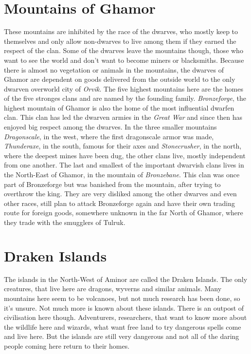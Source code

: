 \documentclass[oneside]{book}
\begin{document}
	\chapter{Mountains of Ghamor}
	These mountains are inhibited by the race of the dwarves, who mostly keep to themselves and only allow non-dwarves to live among them if they earned the respect of the clan. 
	Some of the dwarves leave the mountains though, those who want to see the world and don't want to become miners or blacksmiths.
	Because there is almost no vegetation or animals in the mountains, the dwarves of Ghamor are dependent on goods delivered from the outside world to the only dwarven overworld city of \textit{Orvik}.
	The five highest mountains here are the homes of the five stronges clans and are named by the founding family.
	\textit{Bronzeforge}, the highest mountain of Ghamor is also the home of the most influential dwarfen clan. 
	This clan has led the dwarven armies in the \textit{Great War} and since then has enjoyed big respect among the dwarves.
	In the three smaller mountains \textit{Dragonscale}, in the west, where the first dragonscale armor was made,
	\textit{Thunderaxe}, in the south, famous for their axes and \textit{Stonecrusher}, in the north, where the deepest mines have been dug, the other clans live, mostly independent from one another.
	The last and smallest of the important dwarvish clans lives in the North-East of Ghamor, in the mountain of \textit{Bronzebane}.
	This clan was once part of Bronzeforge but was banished from the mountain, after trying to overthrow the king.
	They are very disliked among the other dwarves and even other races, still plan to attack Bronzeforge again and have their own trading route for foreign goods, somewhere unknown in the far North of Ghamor, where they trade with the smugglers of Tulruk.
	
	\chapter{Draken Islands}
	The islands in the North-West of Aminor are called the Draken Islands.
	The only creatures, that live here are dragons, wyverns and similar animals. Many mountains here seem to be volcanoes, but not much research has been done, so it's unsure.
	Not much more is known about these islands. There is an outpost of civilisation here though.
	Adventurers, researchers, that want to know more about the wildlife here and wizards, what want free land to try dangerous spells come and live here.
	But the islands are still very dangerous and not all of the daring people coming here return to their homes.
	
\end{document}
